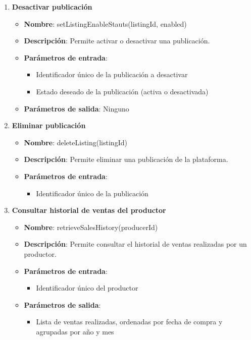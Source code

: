 \begin{enumerate}[label=SOP-\protect\twodigits{\arabic*}:, align=left, leftmargin=*]
\item \textbf{Desactivar publicación}
\begin{itemize}
\item \textbf{Nombre}: setListingEnableStauts(listingId, enabled)
\item \textbf{Descripción}: Permite activar o desactivar una publicación.
\item \textbf{Parámetros de entrada}:
\begin{itemize}
\item Identificador único de la publicación a desactivar
\item Estado deseado de la publicación (activa o desactivada)
\end{itemize}
\item \textbf{Parámetros de salida}: Ninguno
\end{itemize}

\item \textbf{Eliminar publicación}
\begin{itemize}
\item \textbf{Nombre}: deleteListing(listingId)
\item \textbf{Descripción}: Permite eliminar una publicación de la plataforma.
\item \textbf{Parámetros de entrada}:
\begin{itemize}
\item Identificador único de la publicación
\end{itemize}
\end{itemize}

\item \textbf{Consultar historial de ventas del productor}
\begin{itemize}
\item \textbf{Nombre}: retrieveSalesHistory(producerId)
\item \textbf{Descripción}: Permite consultar el historial de ventas realizadas por un productor.
\item \textbf{Parámetros de entrada}:
\begin{itemize}
\item Identificador único del productor
\end{itemize}
\item \textbf{Parámetros de salida}:
\begin{itemize}
\item Lista de ventas realizadas, ordenadas por fecha de compra y agrupadas por año y mes
\end{itemize}
\end{itemize}


\end{enumerate}
